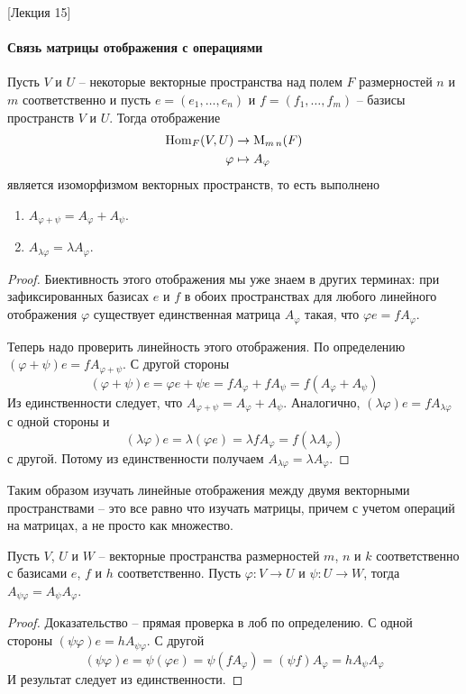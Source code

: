 [Лекция 15]


\paragraph{Связь матрицы отображения с операциями}

\begin{claim}
Пусть $V$ и $U$ -- некоторые векторные пространства над полем $F$ размерностей $n$ и $m$ соответственно и пусть $e=(e_1,\ldots,e_n)$ и $f = (f_1,\ldots,f_m)$ -- базисы пространств $V$ и $U$.
Тогда отображение
\begin{align*}
\operatorname{Hom}_F (V,U) &\to \operatorname{M}_{m\,n}(F)\\
\varphi &\mapsto A_\varphi
\end{align*}
является изоморфизмом векторных пространств, то есть выполнено
\begin{enumerate}
\item $A_{\varphi + \psi} = A_\varphi + A_\psi$.

\item $A_{\lambda \varphi} = \lambda A_\varphi$.
\end{enumerate}
\end{claim}
\begin{proof}
Биективность этого отображения мы уже знаем в других терминах: при зафиксированных базисах $e$ и $f$ в обоих пространствах для любого линейного отображения $\varphi$ существует единственная матрица $A_\varphi$ такая, что $\varphi e = f A_\varphi$.

Теперь надо проверить линейность этого отображения.
По определению
$(\varphi + \psi)e = f A_{\varphi + \psi}$.
С другой стороны
\[
(\varphi+\psi)e = \varphi e + \psi e = f A_\varphi + f A_\psi = f(A_\varphi + A_\psi)
\]
Из единственности следует, что $A_{\varphi + \psi} = A_\varphi + A_\psi$.
Аналогично, $(\lambda \varphi) e = f A_{\lambda \varphi}$ с одной стороны и
\[
(\lambda \varphi) e = \lambda (\varphi e) = \lambda f A_\varphi = f (\lambda A_\varphi)
\]
с другой.
Потому из единственности получаем $A_{\lambda \varphi} = \lambda A_\varphi$.
\end{proof}

Таким образом изучать линейные отображения между двумя векторными пространствами -- это все равно что изучать матрицы, причем с учетом операций на матрицах, а не просто как множество.

\begin{claim}
Пусть $V$, $U$ и $W$ -- векторные пространства размерностей $m$, $n$ и $k$ соответственно с базисами $e$, $f$ и $h$ соответственно.
Пусть $\varphi\colon V\to U$ и $\psi \colon U\to W$, тогда $A_{\psi \varphi} = A_\psi A_\varphi$.
\end{claim}
\begin{proof}
Доказательство -- прямая проверка в лоб по определению.
С одной стороны $(\psi \varphi) e = h A_{\psi \varphi}$.
С другой
\[
(\psi\varphi) e = \psi (\varphi e) = \psi (f A_\varphi) = (\psi f) A_\varphi = h A_\psi A_\varphi
\]
И результат следует из единственности.
\end{proof}

